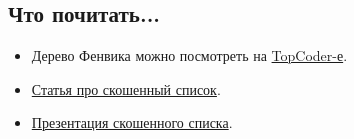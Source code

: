 \subsection{Что почитать...}

\begin{itemize}
  
  \item Дерево Фенвика можно посмотреть на \href{http://community.topcoder.com/tc?module=Static&d1=tutorials&d2=binaryIndexedTrees}{TopCoder-е}.

  \item \href{http://citeseerx.ist.psu.edu/viewdoc/download?doi=10.1.1.55.5156&rep=rep1&type=pdf}{Статья про скошенный список}.
  
  \item \href{http://www.slideshare.net/ekmett/skewbinary-online-lowest-common-ancestor-search}{Презентация скошенного списка}.

\end{itemize}


\clearpage
